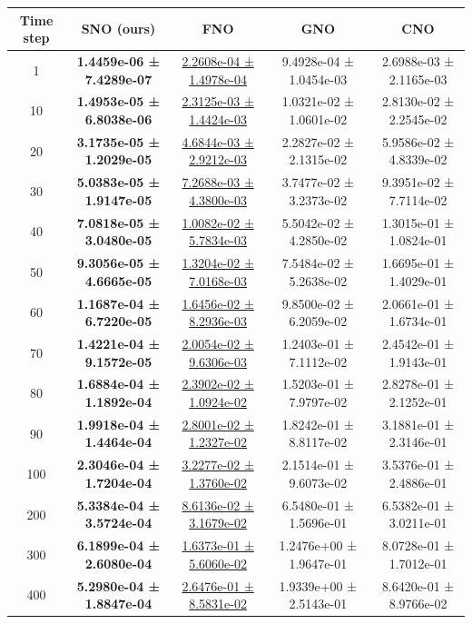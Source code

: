 \documentclass{article}
\theoremstyle{plain}
\theoremstyle{definition}
\theoremstyle{remark}
\begin{document}
\begin{table}[htbp]
\centering
\small
\setlength{\tabcolsep}{6pt}
\begin{tabular}{ccccc}
\hline
Time step & SNO (ours) & FNO & GNO & CNO \\
\hline
1   & \textbf{1.4459e-06 ± 7.4289e-07} & \underline{2.2608e-04 ± 1.4978e-04} & 9.4928e-04 ± 1.0454e-03 & 2.6988e-03 ± 2.1165e-03 \\
10  & \textbf{1.4953e-05 ± 6.8038e-06} & \underline{2.3125e-03 ± 1.4424e-03} & 1.0321e-02 ± 1.0601e-02 & 2.8130e-02 ± 2.2545e-02 \\
20  & \textbf{3.1735e-05 ± 1.2029e-05} & \underline{4.6844e-03 ± 2.9212e-03} & 2.2827e-02 ± 2.1315e-02 & 5.9586e-02 ± 4.8339e-02 \\
30  & \textbf{5.0383e-05 ± 1.9147e-05} & \underline{7.2688e-03 ± 4.3800e-03} & 3.7477e-02 ± 3.2373e-02 & 9.3951e-02 ± 7.7114e-02 \\
40  & \textbf{7.0818e-05 ± 3.0480e-05} & \underline{1.0082e-02 ± 5.7834e-03} & 5.5042e-02 ± 4.2850e-02 & 1.3015e-01 ± 1.0824e-01 \\
50  & \textbf{9.3056e-05 ± 4.6665e-05} & \underline{1.3204e-02 ± 7.0168e-03} & 7.5484e-02 ± 5.2638e-02 & 1.6695e-01 ± 1.4029e-01 \\
60  & \textbf{1.1687e-04 ± 6.7220e-05} & \underline{1.6456e-02 ± 8.2936e-03} & 9.8500e-02 ± 6.2059e-02 & 2.0661e-01 ± 1.6734e-01 \\
70  & \textbf{1.4221e-04 ± 9.1572e-05} & \underline{2.0054e-02 ± 9.6306e-03} & 1.2403e-01 ± 7.1112e-02 & 2.4542e-01 ± 1.9143e-01 \\
80  & \textbf{1.6884e-04 ± 1.1892e-04} & \underline{2.3902e-02 ± 1.0924e-02} & 1.5203e-01 ± 7.9797e-02 & 2.8278e-01 ± 2.1252e-01 \\
90  & \textbf{1.9918e-04 ± 1.4464e-04} & \underline{2.8001e-02 ± 1.2327e-02} & 1.8242e-01 ± 8.8117e-02 & 3.1881e-01 ± 2.3146e-01 \\
100 & \textbf{2.3046e-04 ± 1.7204e-04} & \underline{3.2277e-02 ± 1.3760e-02} & 2.1514e-01 ± 9.6073e-02 & 3.5376e-01 ± 2.4886e-01 \\
200 & \textbf{5.3384e-04 ± 3.5724e-04} & \underline{8.6136e-02 ± 3.1679e-02} & 6.5480e-01 ± 1.5696e-01 & 6.5382e-01 ± 3.0211e-01 \\
300 & \textbf{6.1899e-04 ± 2.6080e-04} & \underline{1.6373e-01 ± 5.6060e-02} & 1.2476e+00 ± 1.9647e-01 & 8.0728e-01 ± 1.7012e-01 \\
400 & \textbf{5.2980e-04 ± 1.8847e-04} & \underline{2.6476e-01 ± 8.5831e-02} & 1.9339e+00 ± 2.5143e-01 & 8.6420e-01 ± 8.9766e-02 \\

\end{tabular}
\end{table}
\end{document}
